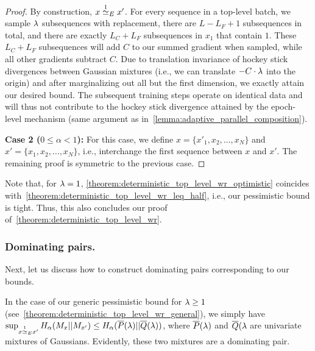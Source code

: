 \begin{proof}
    By construction, $x \overset{1}{\simeq}_{E} x'$.
    For every sequence in a top-level batch,
    we sample $\lambda$ subsequences with replacement, there are $L - L_F + 1$ subsequences in total, and there are exactly $L_C + L_F$ subsequences in $x_1$ that contain $1$.
    These $L_C + L_F$ subsequences will add $C$ to our summed gradient when sampled, while all other gradients subtract $C$.
    Due to translation invariance of hockey stick divergences between Gaussian mixtures (i.e., we can translate $-C \cdot \lambda$ into the origin) and after marginalizing out all but the first dimension, we exactly attain our desired bound.
    The subsequent training steps operate on identical data and will thus not contribute to the hockey stick divergence attained by the epoch-level mechanism (same argument as in~\cref{lemma:adaptive_parallel_composition}).

    \textbf{Case 2 ($0 \leq \alpha < 1$):}
    For this case, we define $x = \{x'_1,x_2,\dots,x_N\}$ and $x' = \{x_1,x_2,\dots,x_N\}$, i.e., interchange the first sequence between $x$ and $x'$.
    The remaining proof is symmetric to the previous case.
\end{proof}
Note that, for $\lambda = 1$, \cref{theorem:deterministic_top_level_wr_optimistic} coincides with~\cref{theorem:deterministic_top_level_wr_leq_half}, i.e., our pessimistic bound is tight. Thus, this also concludes our proof of~\cref{theorem:deterministic_top_level_wr}.

\subsubsection{Dominating pairs.}\label{appendix:bottom_level_dominating_pairs}
Next, let us discuss how to construct dominating pairs corresponding to our bounds.

In the case of our generic pessimistic bound for $\lambda \geq 1$ (see~\cref{theorem:deterministic_top_level_wr_general}), we simply have
$\sup_{x \overset{1}{\simeq}_{E} x'} H_\alpha(M_x || M_{x'}) \leq H_\alpha(\overline{P}(\lambda) || \overline{Q}(\lambda))$, where $\overline{P}(\lambda)$ and $\overline{Q}(\lambda$ are univariate mixtures of Gaussians. Evidently, these two mixtures are a dominating pair.


